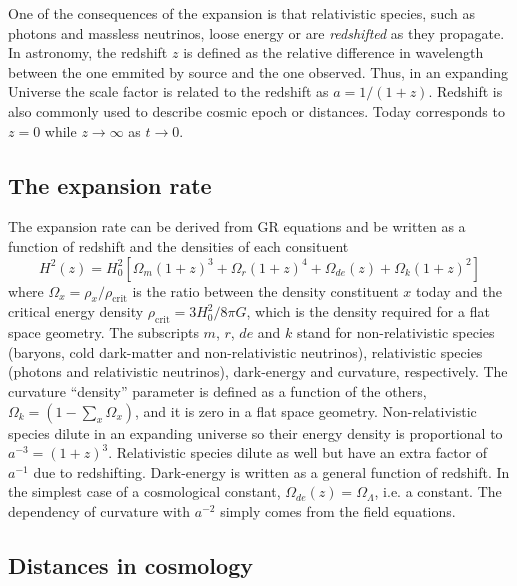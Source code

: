     One of the consequences of the expansion is that relativistic species, such 
    as photons and massless neutrinos, loose energy or are \emph{redshifted} as they 
    propagate. In astronomy, the redshift $z$ is defined as the relative difference
    in wavelength between the one emmited by source and the one observed.  
    Thus, in an expanding Universe the scale factor is related to the redshift as 
    $a = 1/(1+z)$. Redshift is also commonly used to describe cosmic epoch or distances.
    Today corresponds to $z=0$ while $z \rightarrow \infty$ as $t \rightarrow 0$. 

    \subsection{The expansion rate}
    \label{intro:model:expansion_rate}

    The expansion rate can be derived from GR equations and be written as a function of 
    redshift and the densities of each consituent
    \begin{equation}
        H^2(z) = H^2_0 \left[ \Omega_m(1+z)^3 + \Omega_r (1+z)^4 + \Omega_{de}(z) + \Omega_k(1+z)^2\right]
        \label{eq:expansion_rate}
    \end{equation}
    where $\Omega_x = \rho_x / \rho_\mathrm{ crit}$ is the ratio between the density 
    constituent $x$ today and the critical energy density $\rho_\mathrm{ crit} = 3H_0^2/8\pi G$, 
    which is the density required for a flat space geometry. 
    The subscripts $m$, $r$, $de$ and $k$ stand
    for non-relativistic species (baryons, cold dark-matter and non-relativistic neutrinos), 
    relativistic species (photons and relativistic neutrinos), dark-energy and curvature, 
    respectively. The curvature ``density'' parameter is defined as a function of the others,
    $\Omega_k = (1-\sum_x \Omega_x)$, and it is zero in a flat space geometry.
    Non-relativistic species dilute in an expanding universe so their energy density is 
    proportional to $a^{-3} = (1+z)^3$. Relativistic species dilute as well but have an
    extra factor of $a^{-1}$ due to redshifting. 
    Dark-energy is written as a general function of redshift. 
    In the simplest case of a cosmological constant, $\Omega_{de}(z) = \Omega_\Lambda$, i.e. a constant.
    The dependency of curvature with $a^{-2}$ simply comes from the field equations. 

    \subsection{Distances in cosmology}
    \label{intro:model:distances}

